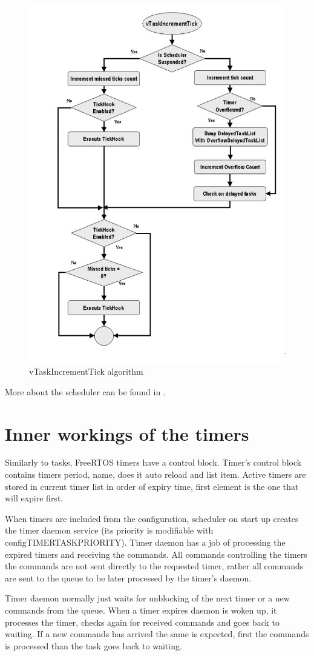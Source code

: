 \begin{figure}[H]

      \centering
      \includegraphics[width=0.8\linewidth]{images/freertos_scheduler_increment.png}
      \caption{vTaskIncrementTick algorithm\citep[p~31]{freertos_inner_workings}}
      \label{fig:freertos_scheduler_increment}
    
\end{figure}

More about the scheduler can be found in \citep{freertos_inner_workings}.

\section{Inner workings of the timers}

Similarly to tasks, FreeRTOS timers have a control block. Timer's control block contains timers period, name, does it auto reload and list item. Active timers are stored in current timer list in order of expiry time, first element is the one that will expire first.

When timers are included from the configuration, scheduler on start up  creates the timer daemon service (its priority is modifiable with configTIMER\textunderscore TASK\textunderscore PRIORITY). Timer daemon has a job of processing the expired timers and receiving the commands. All commands controlling the timers the commands are not sent directly to the requested timer, rather all commands are sent to the queue to be later processed by the timer's daemon.

Timer daemon normally just waits for unblocking of the next timer or a new commands from the queue. When a timer expires daemon is woken up, it processes the timer, checks again for received commands and goes back to waiting. If a new commands has arrived the same is expected, first the commands is processed than the task goes back to waiting.
